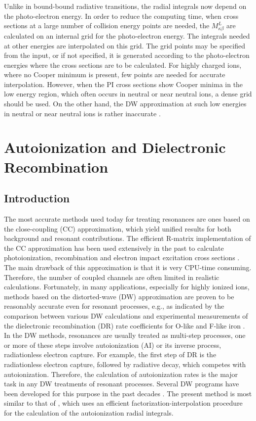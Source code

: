 Unlike in bound-bound radiative transitions, the radial integrals now
depend on the photo-electron energy. In order to reduce the computing time,
when cross sections at a large number of collision energy points are needed,
the $M^L_{\kappa\beta}$ are calculated on an internal grid for the
photo-electron energy. The integrals needed at other energies are interpolated
on this grid. The grid points may be specified from the input, or if not
specified, it is generated according to the photo-electron energies where the
cross sections are to be calculated. For highly charged ions, where no Cooper
minimum is present, few points are needed for accurate interpolation. However,
when the PI cross sections show Cooper minima in the low energy region, which
often occurs in neutral or near neutral ions, a dense grid
should be used. On the other hand, the DW approximation at such low energies
in neutral or near neutral ions is rather inaccurate \cite{zhang98}.


\section{Autoionization and Dielectronic Recombination}
\subsection{Introduction}
The most accurate methods used today for treating resonances are ones based on
the close-coupling (CC) approximation, which yield unified results for both
background and resonant contributions. The efficient R-matrix implementation
of the CC approximation has been used extensively in the past to calculate
photoionization, recombination and electron impact excitation cross sections
\cite{hummer93, berrington95}. The main drawback of this approximation is
that it is very CPU-time consuming. Therefore, the number of coupled
channels are often limited in realistic calculations. Fortunately, in many
applications, especially for highly 
ionized ions, methods based on the distorted-wave (DW) approximation are
proven to be reasonably accurate even for resonant processes, e.g., as
indicated by the comparison between various DW calculations and experimental 
measurements of the dielectronic recombination (DR) rate coefficients for
O-like and F-like iron \cite{savin99}. In the DW methods, resonances are
usually treated as 
multi-step processes, one or more of these steps involve autoionization (AI)
or its inverse process, radiationless
electron capture. For example, the first step of DR is the radiationless
electron capture, followed by radiative decay, which competes with
autoionization. Therefore, the calculation of autoionization rates is the
major task in any DW treatments of resonant processes. Several DW programs
have been developed for this purpose in the past decades \cite{pindzola80,
kim87, oreg91}. The present method is most similar to that of
\citet{oreg91}, which uses an efficient factorization-interpolation procedure
for the calculation of the autoionization radial integrals. 

